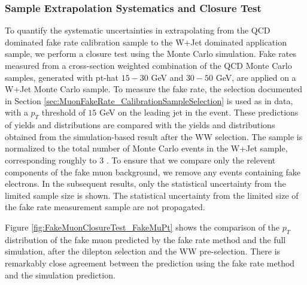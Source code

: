 \subsubsection{Sample Extrapolation Systematics and Closure Test}
\label{sec:FakeMuonBkgClosureTest}
 To quantify the systematic uncertainties in extrapolating from the QCD dominated fake rate
calibration sample to the W+Jet dominated application sample, we perform a closure test using 
the Monte Carlo simulation. Fake rates measured from a cross-section weighted combination of 
the QCD Monte Carlo samples, generated with pt-hat $15-30$ GeV and $30-50$ GeV, are applied on
a W+Jet Monte Carlo sample. To measure the fake rate, the selection documented in Section
\ref{sec:MuonFakeRate_CalibrationSampleSelection} is used as in data, with a $p_{T}$ 
threshold of $15$ GeV on the leading jet in the event. These predictions of yields and 
distributions are compared with the yields and distributions obtained from the 
simulation-based result after the WW selection. The sample is normalized to the 
total number of Monte Carlo events in the W+Jet sample, corresponding roughly to $3$ \ifb.
To ensure that we compare only the relevent components of the fake muon background,
we remove any events containing fake electrons. In the subsequent results, 
only the statistical uncertainty from the limited sample size is shown. 
The statistical uncertainty from the limited size of 
the fake rate measurement sample are not propagated. 

Figure \ref{fig:FakeMuonClosureTest_FakeMuPt} shows the comparison of the $p_{T}$
distribution of the fake muon predicted by the fake rate method and the full simulation,
after the dilepton selection and the WW pre-selection. There is remarkably close 
agreement between the prediction using the fake rate method and the simulation
prediction.

